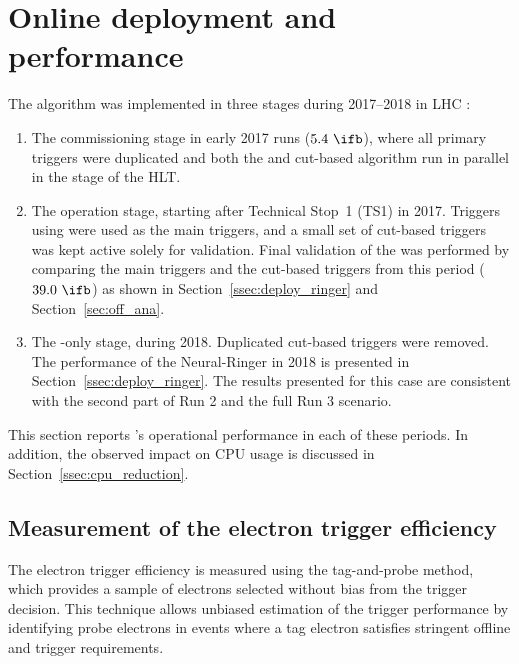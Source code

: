 \section{Online deployment and performance}%
\label{sec:operation}


 The \rnn{} algorithm was implemented in three stages during 2017--2018 in LHC \RunTwo:

\begin{enumerate}[i]
  
  \item The commissioning stage in early 2017 runs ($5.4~\ifb$), where all primary triggers were duplicated and both the \rnn{} and cut-based algorithm run in parallel in the \fastcalo{} stage of the HLT.
  
\item The operation stage, starting after Technical Stop~1 (TS1) in 2017. 
Triggers using \rnn{} were used as the main triggers, and a small set of cut-based triggers was kept active solely for validation. 
Final validation of the \rnn{} was performed by comparing the main triggers and the cut-based triggers from this period ($39.0~\ifb$) as shown in Section~\ref{ssec:deploy_ringer} and Section~\ref{sec:off_ana}.

\item The \rnn{}-only stage, during 2018. Duplicated cut-based triggers were removed. The performance of the Neural-Ringer in 2018 is presented in Section~\ref{ssec:deploy_ringer}. The results presented for this case are consistent with the second part of Run 2 and the full Run 3 scenario.
    
\end{enumerate}

This section reports \rnn{}'s operational performance in each of these periods. In addition, the observed impact on CPU usage is discussed in Section~\ref{ssec:cpu_reduction}.

\subsection{Measurement of the electron trigger efficiency}

The electron trigger efficiency is measured using the tag-and-probe method, which provides a sample of electrons selected without bias from the trigger decision. This technique allows unbiased estimation of the trigger performance by identifying probe electrons in events where a tag electron satisfies stringent offline and trigger requirements.

